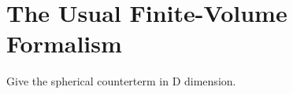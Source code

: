 \section{The Usual \Luscher Finite-Volume Formalism}\label{sec:formalism/spherical}


Give the spherical counterterm in D dimension.
